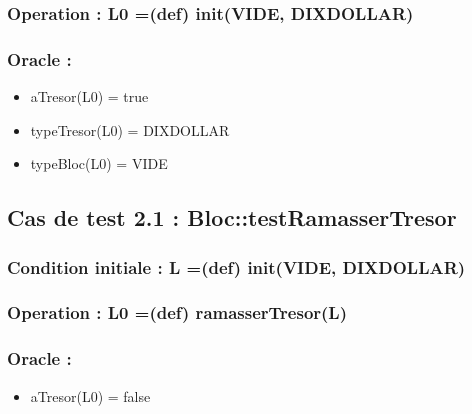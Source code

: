 \documentclass[11pt]{article}
\begin{document}
\subsubsection{Operation : L0 =(def) init(VIDE, DIXDOLLAR)}
\label{sec-1.2.2}

\subsubsection{Oracle :}
\label{sec-1.2.3}

\begin{itemize}

\item aTresor(L0) = true\\
\label{sec-1.2.3.1}


\item typeTresor(L0) = DIXDOLLAR\\
\label{sec-1.2.3.2}


\item typeBloc(L0) = VIDE\\
\label{sec-1.2.3.3}





\end{itemize} %
\subsection{Cas de test 2.1 : Bloc::testRamasserTresor}
\label{sec-1.3}

\subsubsection{Condition initiale : L =(def) init(VIDE, DIXDOLLAR)}
\label{sec-1.3.1}

\subsubsection{Operation : L0 =(def) ramasserTresor(L)}
\label{sec-1.3.2}

\subsubsection{Oracle :}
\label{sec-1.3.3}

\begin{itemize}

\item aTresor(L0) = false\\
\label{sec-1.3.3.1}


\end{itemize} %
\end{document}
